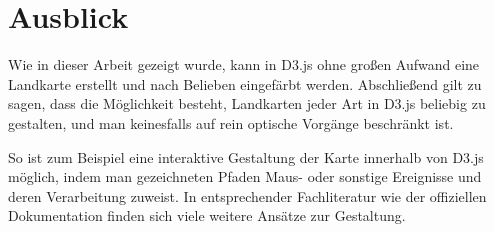 
\chapter{Ausblick}
\label{ch:conclusion}

Wie in dieser Arbeit gezeigt wurde, kann in D3.js ohne großen Aufwand eine Landkarte erstellt und nach Belieben eingefärbt werden. Abschließend gilt zu sagen, dass die Möglichkeit besteht, Landkarten jeder Art in D3.js beliebig zu gestalten, und man keinesfalls auf rein optische Vorgänge beschränkt ist. 

So ist zum Beispiel eine interaktive Gestaltung der Karte innerhalb von D3.js möglich, indem man gezeichneten Pfaden Maus- oder sonstige Ereignisse und deren Verarbeitung zuweist. In entsprechender Fachliteratur wie der offiziellen Dokumentation finden sich viele weitere Ansätze zur Gestaltung.